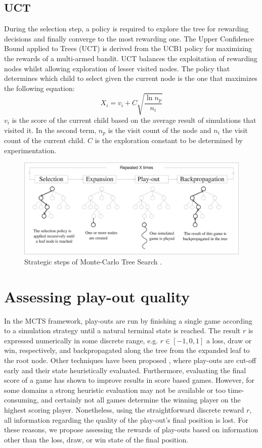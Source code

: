 \documentclass{ecai2010}
\begin{document}
\subsection{UCT}
\label{subsec:uct}
During the selection step, a policy is required to explore the tree for rewarding decisions and finally converge to the most rewarding one. The Upper Confidence Bound applied to Trees (UCT) \cite{kocsis2006bandit} is derived from the UCB1 policy \cite{auer2002using} for maximizing the rewards of a multi-armed bandit. UCT balances the exploitation of rewarding nodes whilst allowing exploration of lesser visited nodes. The policy that determines which child to select given the current node is the one that maximizes the following equation:
\begin{equation}
\label{eq:uct}
X_i = v_i + C \sqrt{ \frac{\ln{n_p}}{n_i}}
\end{equation}
$v_i$ is the score of the current child based on the average result of simulations that visited it. In the second term, $n_p$ is the visit count of the node and $n_i$ the visit count of the current child. $C$ is the exploration constant to be determined by experimentation.
\begin{figure}[t]
	\centering
	\includegraphics[width=.45\textwidth]{img/figure1.eps}
	\caption{Strategic steps of Monte-Carlo Tree Search \cite{chaslot2008progressive}.}
	\label{fig:mcts-algorithm}
\end{figure}

\section{Assessing play-out quality}
\label{sec:poqual}
In the MCTS framework, play-outs are run by finishing a single game according to a simulation strategy until a natural terminal state is reached. The result $r$ is expressed numerically in some discrete range, e.g. $r \in [-1, 0, 1]$ a loss, draw or win, respectively, and backpropagated along the tree from the expanded leaf to the root node. Other techniques have been proposed \cite{Winands2010a}, where play-outs are cut-off early and their state heuristically evaluated. Furthermore, evaluating the final score of a game has shown to improve results in score based games. However, for some domains a strong heuristic evaluation may not be available or too time-consuming, and certainly not all games determine the winning player on the highest scoring player. Nonetheless, using the straightforward discrete reward $r$, all information regarding the quality of the play-out's final position is lost. For these reasons, we propose assessing the rewards of play-outs based on information other than the loss, draw, or win state of the final position.
\end{document}
